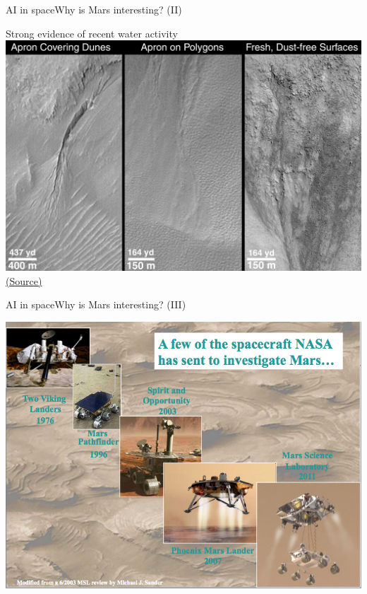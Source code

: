 \documentclass[10pt,compress]{beamer} %
\begin{document}
{	\begin{frame}{AI in space}{Why is Mars interesting? (II)}
		\vspace{-0.2cm}
		\begin{center}
			Strong evidence of recent water activity\\
			\includegraphics[width=0.8\linewidth]{figs/marswater.jpg}\\
			\tiny{\href{http://www.msss.com/mars_images/moc/june2000/age/index.html}{(Source)}}
		\end{center}
	\end{frame}

	\begin{frame}{AI in space}{Why is Mars interesting? (III)}
		\vspace{-0.2cm}
		\begin{center}
			\includegraphics[width=0.8\linewidth]{figs/rovers.png}
		\end{center}
	\end{frame}

}
\end{document}
